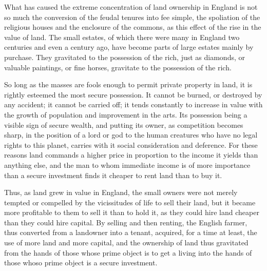 \documentclass{book}
\begin{document}
What has caused the extreme concentration of land ownership in England is not so much the conversion of the feudal tenures into fee simple, the spoliation of the religious houses and the enclosure of the commons, as this effect of the rise in the value of land. The small estates, of which there were many in England two centuries and even a century ago, have become parts of large estates mainly by purchase. They gravitated to the possession of the rich, just as diamonds, or valuable paintings, or fine horses, gravitate to the possession of the rich.

So long as the masses are fools enough to permit private property in land, it is rightly esteemed the most secure possession. It cannot be burned, or destroyed by any accident; it cannot be carried off; it tends constantly to increase in value with the growth of population and improvement in the arts. Its possession being a visible sign of secure wealth, and putting its owner, as competition becomes sharp, in the position of a lord or god to the human creatures who have no legal rights to this planet, carries with it social consideration and deference. For these reasons land commands a higher price in proportion to the income it yields than anything else, and the man to whom immediate income is of more importance than a secure investment finds it cheaper to rent land than to buy it.

Thus, as land grew in value in England, the small owners were not merely tempted or compelled by the vicissitudes of life to sell their land, but it became more profitable to them to sell it than to hold it, as they could hire land cheaper than they could hire capital. By selling and then renting, the English farmer, thus converted from a landowner into a tenant, acquired, for a time at least, the use of more land and more capital, and the ownership of land thus gravitated from the hands of those whose prime object is to get a living into the hands of those whoso prime object is a secure investment.
\end{document}
